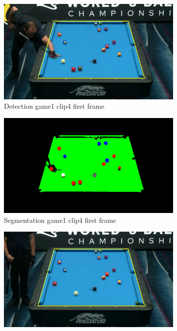 \begin{figure}[H]
    \centering
    \begin{subfigure}[b]{0.35\textwidth}
        \centering
        \includegraphics[width=\textwidth]{images/Detection/game1_clip4_detected_balls_first_frame.jpg}
        \caption{Detection game1 clip4 first frame}
        \label{fig: game1_clip4_first_frame_detected}
    \end{subfigure}
    \begin{subfigure}[b]{0.35\textwidth}
        \centering
        \includegraphics[width=\textwidth]{images/Segmentation/game1_clip4_segmented_balls_first_frame.jpg}
        \caption{Segmentation game1 clip4 first frame}
		\label{fig: game1_clip4_first_frame_segmented}
    \end{subfigure}
    \begin{subfigure}[b]{0.35\textwidth}
        \centering
        \includegraphics[width=\textwidth]{images/Detection/game1_clip4_detected_balls_last_frame.jpg}

\end{subfigure}
\end{figure}
